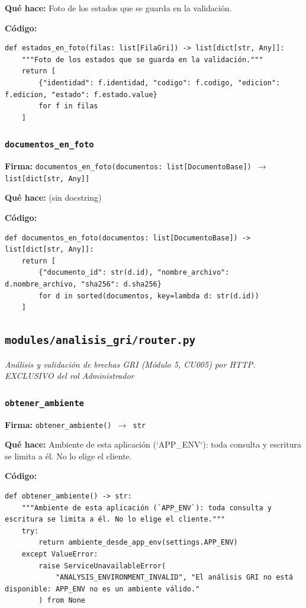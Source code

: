 \documentclass[11pt,a4paper]{article}
\begin{document}
\textbf{Qué hace:} Foto de los estados que se guarda en la validación.

\textbf{Código:}
\begin{lstlisting}
def estados_en_foto(filas: list[FilaGri]) -> list[dict[str, Any]]:
    """Foto de los estados que se guarda en la validación."""
    return [
        {"identidad": f.identidad, "codigo": f.codigo, "edicion": f.edicion, "estado": f.estado.value}
        for f in filas
    ]
\end{lstlisting}

\subsubsection*{\texttt{documentos\_en\_foto}}
\textbf{Firma:} \texttt{documentos\_en\_foto(documentos: list[DocumentoBase]) $\rightarrow$ list[dict[str, Any]]}

\textbf{Qué hace:} (sin docstring)

\textbf{Código:}
\begin{lstlisting}
def documentos_en_foto(documentos: list[DocumentoBase]) -> list[dict[str, Any]]:
    return [
        {"documento_id": str(d.id), "nombre_archivo": d.nombre_archivo, "sha256": d.sha256}
        for d in sorted(documentos, key=lambda d: str(d.id))
    ]
\end{lstlisting}

\subsection{\texttt{modules/analisis\_gri/router.py}}
\textit{Análisis y validación de brechas GRI (Módulo 5, CU005) por HTTP. EXCLUSIVO del rol Administrador}

\subsubsection*{\texttt{obtener\_ambiente}}
\textbf{Firma:} \texttt{obtener\_ambiente() $\rightarrow$ str}

\textbf{Qué hace:} Ambiente de esta aplicación (`APP\_ENV`): toda consulta y escritura se limita a él. No lo elige el cliente.

\textbf{Código:}
\begin{lstlisting}
def obtener_ambiente() -> str:
    """Ambiente de esta aplicación (`APP_ENV`): toda consulta y escritura se limita a él. No lo elige el cliente."""
    try:
        return ambiente_desde_app_env(settings.APP_ENV)
    except ValueError:
        raise ServiceUnavailableError(
            "ANALYSIS_ENVIRONMENT_INVALID", "El análisis GRI no está disponible: APP_ENV no es un ambiente válido."
        ) from None
\end{lstlisting}
\end{document}
